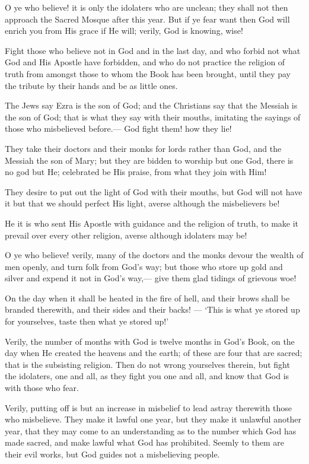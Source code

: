 \documentclass[fontsize=14pt, letterpaper, notitlepage, openany, DIV=12]{scrbook} %
\begin{document}
\noindent[9:28]
O ye who believe! it is only the idolaters who are unclean; they shall not then approach
the Sacred Mosque after this year. But if ye fear want then God will enrich you from His grace if
He will; verily, God is knowing, wise!

\noindent[9:29]
Fight those who believe not in God and in the last day, and who forbid not what God and
His Apostle have forbidden, and who do not practice the religion of truth from amongst those to
whom the Book has been brought, until they pay the tribute by their hands and be as little ones.

\noindent[9:30]
The Jews say Ezra is the son of God; and the Christians say that the Messiah is the son of
God; that is what they say with their mouths, imitating the sayings of those who misbelieved
before.--- God fight them! how they lie!

\noindent[9:31]
They take their doctors and their monks for lords rather than God, and the Messiah the
son of Mary; but they are bidden to worship but one God, there is no god but He; celebrated be
His praise, from what they join with Him!

\noindent[9:32]
They desire to put out the light of God with their mouths, but God will not have it but that
we should perfect His light, averse although the misbelievers be!

\noindent[9:33]
He it is who sent His Apostle with guidance and the religion of truth, to make it prevail
over every other religion, averse although idolaters may be!

\noindent[9:34]
O ye who believe! verily, many of the doctors and the monks devour the wealth of men
openly, and turn folk from God's way; but those who store up gold and silver and expend it not
in God's way,--- give them glad tidings of grievous woe!

\noindent[9:35]
On the day when it shall be heated in the fire of hell, and their brows shall be branded
therewith, and their sides and their backs! --- `This is what ye stored up for yourselves, taste then
what ye stored up!'

\noindent[9:36]
Verily, the number of months with God is twelve months in God's Book, on the day
when He created the heavens and the earth; of these are four that are sacred; that is the subsisting
religion. Then do not wrong yourselves therein, but fight the idolaters, one and all, as they fight
you one and all, and know that God is with those who fear.

\noindent[9:37]
Verily, putting off is but an increase in misbelief to lead astray therewith those who
misbelieve. They make it lawful one year, but they make it unlawful another year, that they may
come to an understanding as to the number which God has made sacred, and make lawful what
God has prohibited. Seemly to them are their evil works, but God guides not a misbelieving
people.
\end{document}
